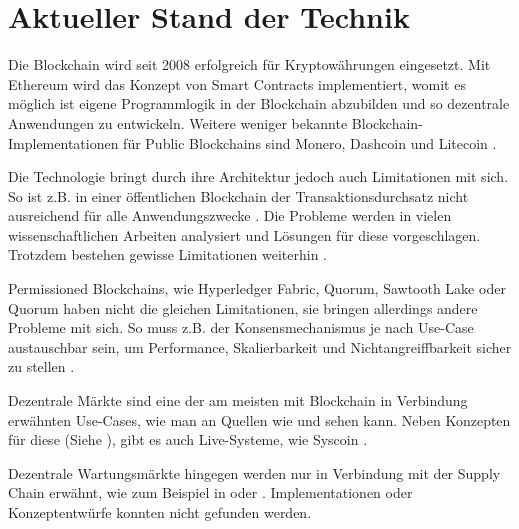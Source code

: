 \chapter{Aktueller Stand der Technik}
\label{cha:stand-technik}

Die Blockchain wird seit 2008 erfolgreich für Kryptowährungen eingesetzt. Mit Ethereum wird das Konzept von Smart Contracts implementiert, womit es möglich ist eigene Programmlogik in der Blockchain abzubilden und so dezentrale Anwendungen zu entwickeln. Weitere weniger bekannte Blockchain-Implementationen für Public Blockchains sind Monero, Dashcoin und Litecoin \cite{BlockchainHubBlockchainsDistributedLedger}. 

Die Technologie bringt durch ihre Architektur jedoch auch Limitationen mit sich. So ist z.B. in einer öffentlichen Blockchain der Transaktionsdurchsatz nicht ausreichend für alle Anwendungszwecke \cite{SchererPerformanceScalabilityBlockchain2017}. Die Probleme werden in vielen wissenschaftlichen Arbeiten analysiert und Lösungen für diese vorgeschlagen. Trotzdem bestehen gewisse Limitationen weiterhin \cite{ZhengBlockchainChallengesOpportunities2017}\cite{SwanBlockchainblueprintnew2015}\cite{SchererPerformanceScalabilityBlockchain2017}.

Permissioned Blockchains, wie Hyperledger Fabric, Quorum, Sawtooth Lake oder Quorum haben nicht die gleichen Limitationen, sie bringen allerdings andere Probleme mit sich. So muss z.B. der Konsensmechanismus je nach Use-Case austauschbar sein, um Performance, Skalierbarkeit und Nichtangreiffbarkeit sicher zu stellen \cite{LiScalablePrivateIndustrial2017}.

Dezentrale Märkte sind eine der am meisten mit Blockchain in Verbindung erwähnten Use-Cases, wie man an Quellen wie \cite{BenHamidaBlockchainEnterpriseOverview2017} und \cite{RavalDecentralizedApplicationsHarnessing2016} sehen kann.
Neben Konzepten für diese (Siehe \cite{KaiserDecentralizedPrivateMarketplace}), gibt es auch Live-Systeme, wie Syscoin \cite{SidhuSyscoinPeertoPeerElectronic2017}.

Dezentrale Wartungsmärkte hingegen werden nur in Verbindung mit der Supply Chain erwähnt, wie zum Beispiel in \cite{SoldatosWhatDoesBlockchain} oder \cite{GotzeLufthansaIndustrySolutions}. Implementationen oder Konzeptentwürfe konnten nicht gefunden werden.




